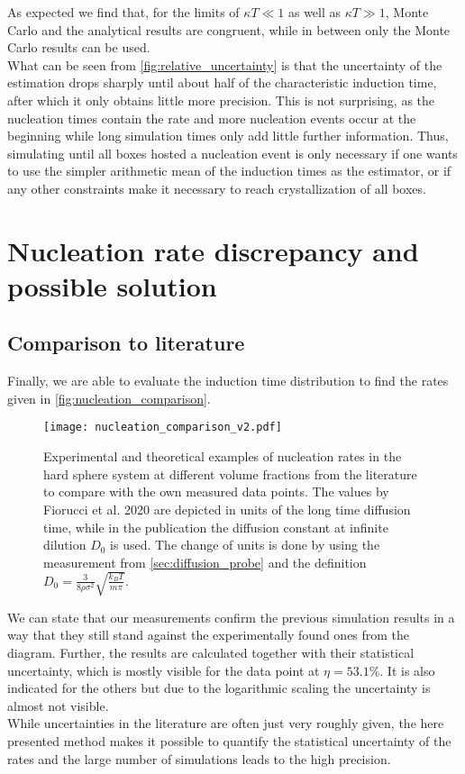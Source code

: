 As expected we find that, for the limits of $\kappa T \ll 1$ as well as $\kappa T \gg 1$, Monte Carlo and the analytical results are congruent, while in between only the Monte Carlo results can be used.\\

What can be seen from \autoref{fig:relative_uncertainty} is that the uncertainty of the estimation drops sharply until about half of the characteristic induction time, after which it only obtains little more precision. This is not surprising, as the nucleation times contain the rate and more nucleation events occur at the beginning while long simulation times only add little further information. Thus, simulating until all boxes hosted a nucleation event is only necessary if one wants to use the simpler arithmetic mean of the induction times as the estimator, or if any other constraints make it necessary to reach crystallization of all boxes.

\section{Nucleation rate discrepancy and possible solution}
\subsection{Comparison to literature}
\label{sec:nucleation_rates}
Finally, we are able to evaluate the induction time distribution to find the rates given in \autoref{fig:nucleation_comparison}.

\begin{figure}[h]
\centering
\texttt{[image: nucleation\_comparison\_v2.pdf]}
\caption[Nucleation rate comparison with literature values]{Experimental and theoretical examples of nucleation rates in the hard sphere system at different volume fractions from the literature\cite{Harland1997,He1996,schaetzel1993,Sinn2001,Auer2001,Filion2010a,Fiorucci2020a,Schilling2011} to compare with the own measured data points. The values by Fiorucci et al. 2020 are depicted in units of the long time diffusion time, while in the publication the diffusion constant at infinite dilution $D_0$ is used. The change of units is done by using the measurement from \autoref{sec:diffusion_probe} and the definition $D_0 = \frac{3}{8\rho \sigma^2} \sqrt{ \frac{k_B T}{m \pi}}$.}
\label{fig:nucleation_comparison}
\end{figure}

We can state that our measurements confirm the previous simulation results in a way that they still stand against the experimentally found ones from the diagram. Further, the results are calculated together with their statistical uncertainty, which is mostly visible for the data point at $\eta = 53.1 \%$. It is also indicated for the others but due to the logarithmic scaling the uncertainty is almost not visible.\\
While uncertainties in the literature are often just very roughly given, the here presented method makes
it possible to quantify the statistical uncertainty of the rates and the large number of simulations leads to the high precision.\\

